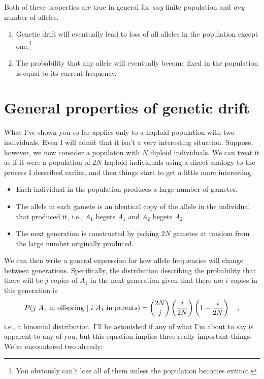 Both of these properties are true in general for {\it any\/} finite
population and {\it any\/} number of alleles.

\begin{enumerate}

\item Genetic drift will eventually lead to loss of all alleles in the
population except one.\footnote{You obviously can't lose all of them
unless the population becomes extinct.}

\item The probability that any allele will eventually become fixed in
the population is equal to its current frequency.

\end{enumerate}

\section*{General properties of genetic drift}

What I've shown you so far applies only to a haploid population with
two individuals. Even I will admit that it isn't a very interesting
situation. Suppose, however, we now consider a populaton with $N$
diploid individuals. We can treat it as if it were a population of
$2N$ haploid individuals using a direct analogy to the process I
described earlier, and then things start to get a little more
interesting.

\begin{itemize}

\item Each individual in the population produces a large number of
gametes.

\item The allele in each gamete is an identical copy of the allele in
  the individual that produced it, i.e., $A_1$ begets $A_1$ and $A_2$
  begets $A_2$.

\item The next generation is constructed by picking $2N$ gametes at
  random from the large number originally produced.

\end{itemize}

We can then write a general expression for how allele frequencies will
change between generations. Specifically, the distribution
describing the probability that there will be $j$ copies of $A_1$ in
the next generation given that there are $i$ copies in this generation
is
\[
P(\hbox{$j$ $A_1$ in offspring $|$ $i$ $A_1$ in parents}) =
{2N \choose j}\left(\frac{i}{2N}\right)\left(1 - \frac{i}{2N}\right)
\quad ,
\]
i.e., a binomial distribution. I'll be astonished if any of what I'm about to say is
apparent to any of you, but this equation implies three really
important things. We've encountered two already:

